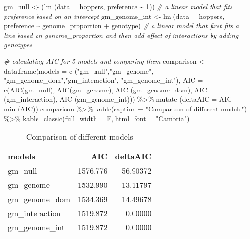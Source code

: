 \documentclass[
]{article}
\newenvironment{Shaded}{\begin{snugshade}}{\end{snugshade}}
\newcommand{\AttributeTok}[1]{\textcolor[rgb]{0.77,0.63,0.00}{#1}}
\newcommand{\CommentTok}[1]{\textcolor[rgb]{0.56,0.35,0.01}{\textit{#1}}}
\newcommand{\DecValTok}[1]{\textcolor[rgb]{0.00,0.00,0.81}{#1}}
\newcommand{\FunctionTok}[1]{\textcolor[rgb]{0.00,0.00,0.00}{#1}}
\newcommand{\NormalTok}[1]{#1}
\newcommand{\OtherTok}[1]{\textcolor[rgb]{0.56,0.35,0.01}{#1}}
\newcommand{\SpecialCharTok}[1]{\textcolor[rgb]{0.00,0.00,0.00}{#1}}
\newcommand{\StringTok}[1]{\textcolor[rgb]{0.31,0.60,0.02}{#1}}
\begin{document}
\begin{Shaded}
\begin{Highlighting}[]
\NormalTok{gm\_null }\OtherTok{\textless{}{-}}\NormalTok{ (}\FunctionTok{lm}\NormalTok{ (}\AttributeTok{data =}\NormalTok{ hoppers, preference }\SpecialCharTok{\textasciitilde{}} \DecValTok{1}\NormalTok{)) }\CommentTok{\# a linear model that fits preference based on an intercept}
\NormalTok{gm\_genome\_int }\OtherTok{\textless{}{-}} \FunctionTok{lm}\NormalTok{ (}\AttributeTok{data =}\NormalTok{ hoppers, preference }\SpecialCharTok{\textasciitilde{}}\NormalTok{ genome\_proportion }\SpecialCharTok{+}\NormalTok{ genotype) }\CommentTok{\# a linear model that first fits a line based on genome\_proportion and then add effect of interactions by adding genotypes}
\end{Highlighting}
\end{Shaded}

\begin{Shaded}
\begin{Highlighting}[]
\CommentTok{\# calculating AIC for 5 models and comparing them }
\NormalTok{comparison }\OtherTok{\textless{}{-}} \FunctionTok{data.frame}\NormalTok{(}\AttributeTok{models  =} \FunctionTok{c}\NormalTok{ (}\StringTok{"gm\_null"}\NormalTok{,}\StringTok{"gm\_genome"}\NormalTok{, }\StringTok{"gm\_genome\_dom"}\NormalTok{,}\StringTok{"gm\_interaction"}\NormalTok{, }\StringTok{"gm\_genome\_int"}\NormalTok{),}
                         \AttributeTok{AIC =} \FunctionTok{c}\NormalTok{(}\FunctionTok{AIC}\NormalTok{(gm\_null), }\FunctionTok{AIC}\NormalTok{(gm\_genome), }\FunctionTok{AIC}\NormalTok{ (gm\_genome\_dom), }\FunctionTok{AIC}\NormalTok{ (gm\_interaction), }\FunctionTok{AIC}\NormalTok{ (gm\_genome\_int))) }\SpecialCharTok{\%\textgreater{}\%} 
  \FunctionTok{mutate}\NormalTok{ (}\AttributeTok{deltaAIC =}\NormalTok{ AIC }\SpecialCharTok{{-}} \FunctionTok{min}\NormalTok{ (AIC))}
\NormalTok{comparison }\SpecialCharTok{\%\textgreater{}\%}   \FunctionTok{kable}\NormalTok{(}\AttributeTok{caption =} \StringTok{"Comparison of different models"}\NormalTok{) }\SpecialCharTok{\%\textgreater{}\%} 
  \FunctionTok{kable\_classic}\NormalTok{(}\AttributeTok{full\_width =}\NormalTok{ F, }\AttributeTok{html\_font =} \StringTok{"Cambria"}\NormalTok{)}
\end{Highlighting}
\end{Shaded}

\begin{table}

\caption{\label{tab:unnamed-chunk-9}Comparison of different models}
\centering
\begin{tabular}[t]{l|r|r}
\hline
models & AIC & deltaAIC\\
\hline
gm\_null & 1576.776 & 56.90372\\
\hline
gm\_genome & 1532.990 & 13.11797\\
\hline
gm\_genome\_dom & 1534.369 & 14.49678\\
\hline
gm\_interaction & 1519.872 & 0.00000\\
\hline
gm\_genome\_int & 1519.872 & 0.00000\\
\hline
\end{tabular}
\end{table}
\end{document}
